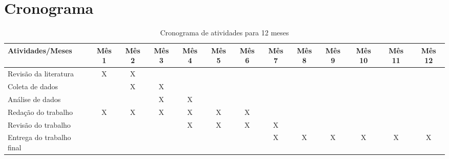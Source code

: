 \section{Cronograma}

\begin{table}[h]
    \centering
    \caption{Cronograma de atividades para 12 meses}
    \label{tab:cronograma}
    \begin{tabular}{|p{4cm}|*{12}{c|}}
        \hline
        \textbf{Atividades/Meses} & \textbf{Mês 1} & \textbf{Mês 2} & \textbf{Mês 3} & \textbf{Mês 4} & \textbf{Mês 5} & \textbf{Mês 6} & \textbf{Mês 7} & \textbf{Mês 8} & \textbf{Mês 9} & \textbf{Mês 10} & \textbf{Mês 11} & \textbf{Mês 12} \\
        \hline
        Revisão da literatura & X & X & & & & & & & & & & \\
        \hline
        Coleta de dados &  & X & X & & & & & & & & & \\
        \hline
        Análise de dados & &  & X & X & & & & & & & & \\
        \hline
        Redação do trabalho & X & X & X & X & X & X & & & & & & \\
        \hline
        Revisão do trabalho & &  & & X & X & X & X & & & & & \\
        \hline
        Entrega do trabalho final & & & & & & & X & X & X & X & X & X \\
        \hline
    \end{tabular}
\end{table}




